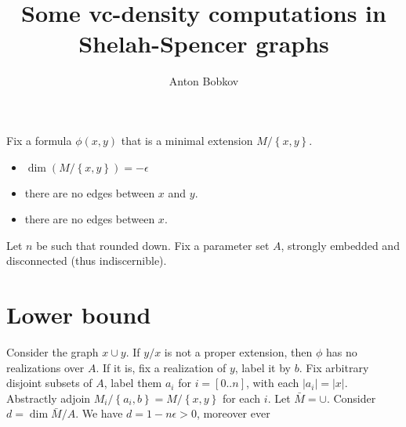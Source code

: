 \documentclass{amsart}
\newcommand{\curly}[1]{\left\{#1\right\}}
\newcommand{\paren}[1]{\left(#1\right)}
\begin{document}
\title{Some vc-density computations in Shelah-Spencer graphs}
\author{Anton Bobkov}

Fix a formula $\phi(x, y)$ that is a minimal extension $M/\curly{x,y}$. 
\begin{itemize}
	\item $\dim \paren{M/\curly{x,y}} = -\epsilon$
	\item there are no edges between $x$ and $y$.
	\item there are no edges between $x$.
\end{itemize}

Let $n$ be such that rounded down.
Fix a parameter set $A$, strongly embedded and disconnected (thus indiscernible).

\section{Lower bound}

Consider the graph $x \cup y$. If $y/x$ is not a proper extension, then $\phi$ has no realizations over $A$. If it is, fix a realization of $y$, label it by $b$. Fix arbitrary disjoint subsets of $A$, label them $a_i$ for $i=[0..n]$, with each $|a_i| = |x|$. Abstractly adjoin $M_i/\curly{a_i, b} = M/\curly{x,y}$ for each $i$. Let $\bar M = \cup$. Consider $d = \dim{\bar M / A}$. We have $d = 1 - n \epsilon > 0$, moreover ever
\end{document}
